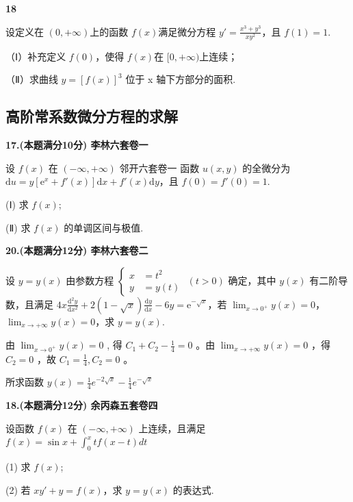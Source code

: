 \documentclass[a4paper,12pt]{article}
\begin{document}
\vspace{0.5cm}

\textbf{18}

设定义在 $(0, +\infty)$上的函数 $f(x)$满足微分方程 $y' = \frac{x^3 + y^3}{xy^2}$，且 $f(1) = 1$.

（Ⅰ）补充定义 $f(0)$，使得 $f(x)$在 $[0,+\infty)$上连续；

（Ⅱ）求曲线 $y = [f(x)]^{3}$ 位于 x 轴下方部分的面积.

\subsection{高阶常系数微分方程的求解}

\textbf{17.(本题满分10分) 李林六套卷一}

设 $f(x)$ 在 $(-∞, +∞)$ 邻开六套卷一 函数 $u(x, y)$ 的全微分为 $\mathrm{d}u = y \left[ \mathrm{e}^{x} + f'(x) \right] \mathrm{d}x + f'(x) \mathrm{d}y$，且 $f(0) = f'(0) = 1$.

(Ⅰ) 求 $f(x)$;

(Ⅱ) 求 $f(x)$ 的单调区间与极值.

\vspace{0.5cm}

\textbf{20.(本题满分12分) 李林六套卷二}

设 $y = y(x)$ 由参数方程 $\left\{\begin{aligned} x &= t^{2} \\ y &= y(t) \end{aligned}\right.$ $(t > 0)$ 确定，其中 $y(x)$ 有二阶导数，且满足 $4x \frac{\mathrm{d}^{2}y}{\mathrm{d}x^{2}} + 2(1 - \sqrt{x}) \frac{\mathrm{d}y}{\mathrm{d}x} - 6y = \mathrm{e}^{-\sqrt{x}}$，若 $\lim_{x \to 0^{+}} y(x) = 0$， $\lim_{x \to +\infty} y(x) = 0$，求 $y = y(x)$.

由 $\lim_{x\to0^{+}}y(x)=0$ , 得 $C_{1}+C_{2}-\frac{1}{4}=0$ 。由 $\lim_{x\to+\infty}y(x)=0$ ，得 $C_{2}=0$ ，故 $C_{1}=\frac{1}{4}, C_{2}=0$ 。

所求函数 $y(x)=\frac{1}{4}e^{-2\sqrt{x}}-\frac{1}{4}e^{-\sqrt{x}}$

\vspace{0.5cm}

\textbf{18.(本题满分12分) 余丙森五套卷四}

设函数 $f(x)$ 在 $(-∞,+∞)$ 上连续，且满足 $f(x)=\sin x+\int_{0}^{x}tf(x-t)dt$

(1) 求 $f(x)$;

(2) 若 $xy' + y = f(x)$，求 $y = y(x)$ 的表达式.

\vspace{0.5cm}
\end{document}

